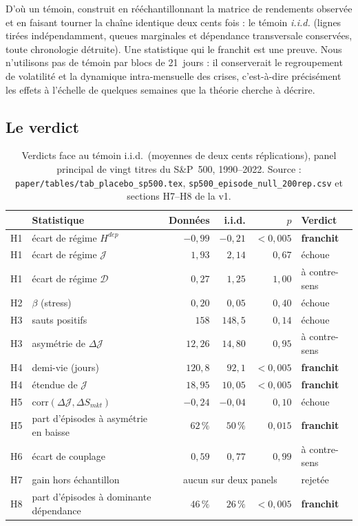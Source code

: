 \documentclass[11pt]{article}
\theoremstyle{definition}
\theoremstyle{remark}
\newcommand{\JJ}{\mathcal{J}}
\newcommand{\DD}{\mathcal{D}}
\begin{document}
D'où un témoin, construit en rééchantillonnant la matrice de rendements
observée et en faisant tourner la chaîne identique deux cents fois : le témoin
\emph{i.i.d.} (lignes tirées indépendamment, queues marginales et dépendance
transversale conservées, toute chronologie détruite). Une statistique qui le
franchit est une preuve. Nous n'utilisons pas de témoin par blocs de
21~jours : il conserverait le regroupement de volatilité et la dynamique
intra-mensuelle des crises, c'est-à-dire précisément les effets à l'échelle de
quelques semaines que la théorie cherche à décrire.

\subsection{Le verdict}

\begin{table}[htbp]
\centering
\small
\begin{tabular}{@{}llrrrl@{}}
\toprule
& Statistique & Données & i.i.d. & $p$ & Verdict \\
\midrule
H1 & écart de régime $H^{dep}$ & $-0{,}99$ & $-0{,}21$ & $<0{,}005$ & \textbf{franchit} \\
H1 & écart de régime $\JJ$ & $1{,}93$ & $2{,}14$ & $0{,}67$ & échoue \\
H1 & écart de régime $\DD$ & $0{,}27$ & $1{,}25$ & $1{,}00$ & à contre-sens \\
H2 & $\beta$ (stress) & $0{,}20$ & $0{,}05$ & $0{,}40$ & échoue \\
H3 & sauts positifs & $158$ & $148{,}5$ & $0{,}14$ & échoue \\
H3 & asymétrie de $\Delta\JJ$ & $12{,}26$ & $14{,}80$ & $0{,}95$ & à contre-sens \\
H4 & demi-vie (jours) & $120{,}8$ & $92{,}1$ & $<0{,}005$ & \textbf{franchit} \\
H4 & étendue de $\JJ$ & $18{,}95$ & $10{,}05$ & $<0{,}005$ & \textbf{franchit} \\
H5 & $\mathrm{corr}(\Delta\JJ,\Delta S_{mkt})$ & $-0{,}24$ & $-0{,}04$ & $0{,}10$ & échoue \\
H5 & part d'épisodes à asymétrie en baisse & $62\,\%$ & $50\,\%$ & $0{,}015$ & \textbf{franchit} \\
H6 & écart de couplage & $0{,}59$ & $0{,}77$ & $0{,}99$ & à contre-sens \\
H7 & gain hors échantillon & \multicolumn{3}{c}{aucun sur deux panels} & rejetée \\
H8 & part d'épisodes à dominante dépendance & $46\,\%$ & $26\,\%$ & $<0{,}005$ & \textbf{franchit} \\
\bottomrule
\end{tabular}
\caption{Verdicts face au témoin i.i.d.\ (moyennes de deux cents réplications),
panel principal de vingt titres du S\&P~500, 1990--2022. Source :
\texttt{paper/tables/tab\_placebo\_sp500.tex}, \texttt{sp500\_episode\_null\_200rep.csv}
et sections H7--H8 de la v1.}
\label{tab:program}
\end{table}
\end{document}
